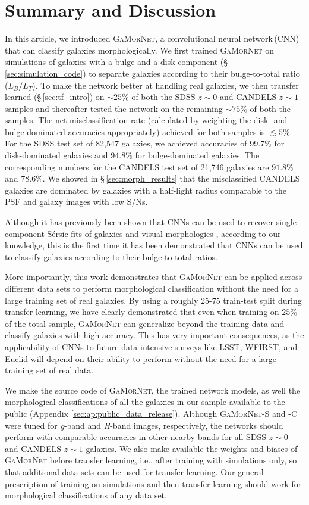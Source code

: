 \documentclass[twocolumn]{aastex63}
\newcommand\sersic{S\'ersic}
\newcommand\gamornet{G\textsc{a}M\textsc{or}N\textsc{et}}
\begin{document}
\section{Summary and Discussion} \label{sec:disc}
In this article, we introduced \gamornet{}, a convolutional neural network\,(CNN) that can classify galaxies morphologically. We first trained \gamornet{} on simulations of galaxies with a bulge and a disk component (\S\,\ref{sec:simulation_code}) to separate galaxies according to their bulge-to-total ratio ($L_B/L_T$). To make the network better at handling real galaxies, we then transfer learned (\S\,\ref{sec:tf_intro}) on $\sim25\%$ of both the SDSS $z\sim0$ and CANDELS $z\sim1$ samples and thereafter tested the network on the remaining $\sim75\%$ of both the samples. The net misclassification rate (calculated by weighting the disk- and bulge-dominated accuracies appropriately) achieved for both samples is $\lesssim 5\%$. For the SDSS test set of 82,547 galaxies, we achieved accuracies of $99.7\%$ for disk-dominated galaxies and $94.8\%$ for bulge-dominated galaxies. The corresponding numbers for the CANDELS test set of 21,746 galaxies are $91.8\%$ and $78.6\%$. We showed in \S\,\ref{sec:morph_results} that the misclassified CANDELS galaxies are dominated by galaxies with a half-light radius comparable to the PSF and galaxy images with low S/Ns. 

Although it has previously been shown that CNNs can be used to recover single-component \sersic{} fits of galaxies and visual morphologies \citep[eg.][]{company_15,tuccillo_18}, according to our knowledge, this is the first time it has been demonstrated that CNNs can be used to classify galaxies according to their bulge-to-total ratios.

More importantly, this work demonstrates that \gamornet{} can be applied across different data sets to perform morphological classification without the need for a large training set of real galaxies. By using a roughly 25-75 train-test split during transfer learning, we have clearly demonstrated that even when training on $25\%$ of the total sample, \gamornet{} can generalize beyond the training data and classify galaxies with high accuracy. This has very important consequences, as the applicability of CNNs to future data-intensive surveys like LSST, WFIRST, and Euclid will depend on their ability to perform without the need for a large training set of real data.

We make the source code of \gamornet{}, the trained network models, as well the morphological classifications of all the galaxies in our sample available to the public (Appendix \ref{sec:ap:public_data_release}). Although \gamornet{}-S and -C were tuned for \textit{g}-band and \textit{H}-band images, respectively, the networks should perform with comparable accuracies in other nearby bands for all SDSS $z\sim0$ and CANDELS $z\sim1$ galaxies. We also make available the weights and biases of \gamornet{} before transfer learning, i.e., after training with simulations only, so that additional data sets can be used for transfer learning. Our general prescription of training on simulations and then transfer learning should work for morphological classifications of any data set.
\end{document}

